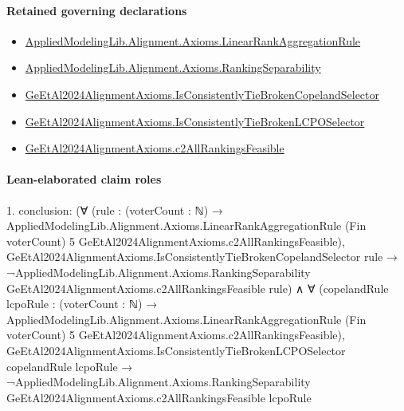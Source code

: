 \documentclass[10pt]{article}
\begin{document}
\paragraph{Retained governing declarations}
\begin{itemize}\raggedright
\item \hyperlink{library-prerequisite-43447e121a1884f9}{Applied\allowbreak{}Modeling\allowbreak{}Lib.\allowbreak{}Alignment.\allowbreak{}Axioms.\allowbreak{}Linear\allowbreak{}Rank\allowbreak{}Aggregation\allowbreak{}Rule}
\item \hyperlink{library-prerequisite-ad3d3904c31ec7b5}{Applied\allowbreak{}Modeling\allowbreak{}Lib.\allowbreak{}Alignment.\allowbreak{}Axioms.\allowbreak{}Ranking\allowbreak{}Separability}
\item \hyperlink{governing-declaration-53cf5556a2792e27}{Ge\allowbreak{}Et\allowbreak{}Al2024\allowbreak{}Alignment\allowbreak{}Axioms.\allowbreak{}Is\allowbreak{}Consistently\allowbreak{}Tie\allowbreak{}Broken\allowbreak{}Copeland\allowbreak{}Selector}
\item \hyperlink{governing-declaration-277839196c52d3a6}{Ge\allowbreak{}Et\allowbreak{}Al2024\allowbreak{}Alignment\allowbreak{}Axioms.\allowbreak{}Is\allowbreak{}Consistently\allowbreak{}Tie\allowbreak{}Broken\allowbreak{}LCPO\allowbreak{}Selector}
\item \hyperlink{governing-declaration-59063c3226cfa149}{Ge\allowbreak{}Et\allowbreak{}Al2024\allowbreak{}Alignment\allowbreak{}Axioms.\allowbreak{}c2\allowbreak{}All\allowbreak{}Rankings\allowbreak{}Feasible}
\end{itemize}
\paragraph{Lean-elaborated claim roles}\begin{ReviewVerbatim}
1. conclusion: (∀
    (rule :
      (voterCount : ℕ) →
        AppliedModelingLib.Alignment.Axioms.LinearRankAggregationRule (Fin voterCount) 5
          GeEtAl2024AlignmentAxioms.c2AllRankingsFeasible),
    GeEtAl2024AlignmentAxioms.IsConsistentlyTieBrokenCopelandSelector rule →
      ¬AppliedModelingLib.Alignment.Axioms.RankingSeparability GeEtAl2024AlignmentAxioms.c2AllRankingsFeasible rule) ∧
  ∀
    (copelandRule lcpoRule :
      (voterCount : ℕ) →
        AppliedModelingLib.Alignment.Axioms.LinearRankAggregationRule (Fin voterCount) 5
          GeEtAl2024AlignmentAxioms.c2AllRankingsFeasible),
    GeEtAl2024AlignmentAxioms.IsConsistentlyTieBrokenLCPOSelector copelandRule lcpoRule →
      ¬AppliedModelingLib.Alignment.Axioms.RankingSeparability GeEtAl2024AlignmentAxioms.c2AllRankingsFeasible lcpoRule
\end{ReviewVerbatim}
\end{document}
